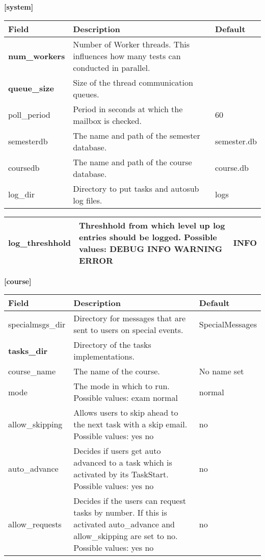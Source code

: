 {\bf [system]}\\
\begin{tabular}{|p{2.5cm}|p{8cm}|p{2.5cm}|}
\hline
{\bf Field} & {\bf Description} & {\bf Default}\\
\hline
\hline
\textbf{num\_workers} & Number of Worker threads. This influences how many tests can conducted
	in parallel. & ~ \\
\hline
\textbf{queue\_size} & Size of the thread communication queues. & ~\\
\hline
poll\_period & Period in seconds at which the mailbox is checked. & 60\\
\hline
semesterdb & The name and path of the semester database. & semester.db\\
\hline
coursedb &  The name and path of the course database. & course.db\\
\hline
log\_dir & Directory to put tasks and autosub log files. & logs  \\
\hline
\end{tabular}
\begin{tabular}{|p{2.5cm}|p{8cm}|p{2.5cm}|}
\hline
log\_threshhold & Threshhold from which level up log entries should be logged.
	Possible values: DEBUG INFO WARNING ERROR & INFO\\
\hline
\end{tabular}

{\bf [course]}\\
\begin{tabular}{|p{2.5cm}|p{8cm}|p{2.5cm}|}
\hline
{\bf Field} & {\bf Description} & {\bf Default}\\
\hline
\hline
specialmsgs\_dir & Directory for messages that are sent to users on special events. &
	SpecialMessages \\
\hline
\textbf{tasks\_dir} & Directory of the tasks implementations. & ~ \\
\hline
course\_name & The name of the course. & No name set \\
\hline
mode & The mode in which to run. Possible values: exam normal & normal \\
\hline
allow\_skipping & Allows users to skip ahead to the next task with a skip email.
	Possible values: yes no & no \\
\hline
auto\_advance & Decides if users get auto advanced to a task which is activated by its
	TaskStart. Possible values: yes no & no \\
\hline
allow\_requests & Decides if the users can request tasks by number. If this is activated
	auto\_advance and allow\_skipping are set to no. Possible values: yes no & no \\
\hline
\end{tabular}

